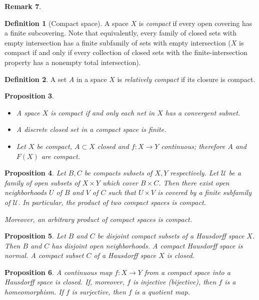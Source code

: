 \documentclass[11pt,a4paper]{article}
\theoremstyle{definition}
\newtheorem{definition}{Definition}[section]
\newtheorem{remark}[definition]{Remark}
\theoremstyle{plain}
\newtheorem{proposition}[definition]{Proposition}
\theoremstyle{remark}
\begin{document}
\begin{remark}
\begin{definition}[Compact space]
  A space $X$ is \emph{compact} if every open covering has a finite subcovering. 
  Note that equivalently, every family of closed sets with empty intersection has a finite 
  subfamily of sets with empty intersection ($X$ is compact if and only if every collection of closed sets with the finite-intersection property has 
  a nonempty total intersection). 
\end{definition}

\begin{definition}
  A set $A$ in a space $X$ is \emph{relatively compact} if its closure is compact.
\end{definition}

\begin{proposition}
  \begin{itemize}
    \item A space $X$ is compact if and only each net in $X$ has a convergent subnet. 
    \item A discrete closed set in a compact space is finite. 
    \item Let $X$ be compact, $ A \subset X$ closed and $f \colon X \to Y$ continuous; therefore $A$ and $F(X)$ are 
    compact. 
  \end{itemize}
\end{proposition}

\begin{proposition}
  Let $B, C$ be compacts subsets of $X, Y$ respectively. Let $\mathcal{U}$ be a family of open subsets of 
  $X \times Y$ which cover $B \times C$. Then there exist open neighborhoods $U$ of $B$ and $V$ of $C$ such that $U \times V$ is covered by a finite 
  subfamily of $\mathcal{U}$. In particular, the product of two compact spaces is compact.

  Moreover, an arbitrary product of compact spaces is compact.
\end{proposition}

\begin{proposition}
  Let $B$ and $C$ be disjoint compact subsets of a Hausdorff space $X$. Then $B$ and $C$ has disjoint open neighborhoods. A compact Hausdorff space is normal. 
  A compact subset $C$ of a Hausdorff space $X$ is closed.   
\end{proposition}

\begin{proposition}
  A continuous map $f \colon X \to Y$ from a compact space into a Hausdorff space is closed.
  If, moreover, $f$ is injective (bijective), then $f$ is a homeomorphism. If $f$ is surjective, then $f$ is a quotient map. 
\end{proposition}


\end{remark}
\end{document}

